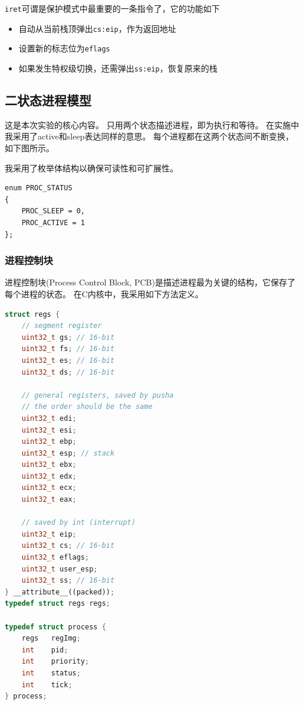 \documentclass[logo,reportComp]{thesis}
\begin{document}
\verb'iret'可谓是保护模式中最重要的一条指令了，它的功能如下
\begin{itemize}
\item 自动从当前栈顶弹出\verb'cs:eip'，作为返回地址
\item 设置新的标志位为\verb'eflags'
\item 如果发生特权级切换，还需弹出\verb'ss:eip'，恢复原来的栈
\end{itemize}

\subsection{二状态进程模型}
\label{sub:process}
这是本次实验的核心内容。
只用两个状态描述进程，即为执行和等待。
在实施中我采用了active和sleep表达同样的意思。
每个进程都在这两个状态间不断变换，如下图所示。
\begin{center}
\end{center}

我采用了枚举体结构以确保可读性和可扩展性。
\begin{lstlisting}
enum PROC_STATUS
{
	PROC_SLEEP = 0,
	PROC_ACTIVE = 1
};
\end{lstlisting}

\subsubsection{进程控制块}
进程控制块(Process Control Block, PCB)是描述进程最为关键的结构，它保存了每个进程的状态。
在C内核中，我采用如下方法定义。
\begin{lstlisting}[language=c++]
struct regs {
	// segment register
	uint32_t gs; // 16-bit
	uint32_t fs; // 16-bit
	uint32_t es; // 16-bit
	uint32_t ds; // 16-bit

	// general registers, saved by pusha
	// the order should be the same
	uint32_t edi;
	uint32_t esi;
	uint32_t ebp;
	uint32_t esp; // stack
	uint32_t ebx;
	uint32_t edx;
	uint32_t ecx;
	uint32_t eax;

	// saved by int (interrupt)
	uint32_t eip;
	uint32_t cs; // 16-bit
	uint32_t eflags;
	uint32_t user_esp;
	uint32_t ss; // 16-bit
} __attribute__((packed));
typedef struct regs regs;

typedef struct process {
	regs   regImg;
	int    pid;
	int    priority;
	int    status;
	int    tick;
} process;
\end{lstlisting}
\end{document}
